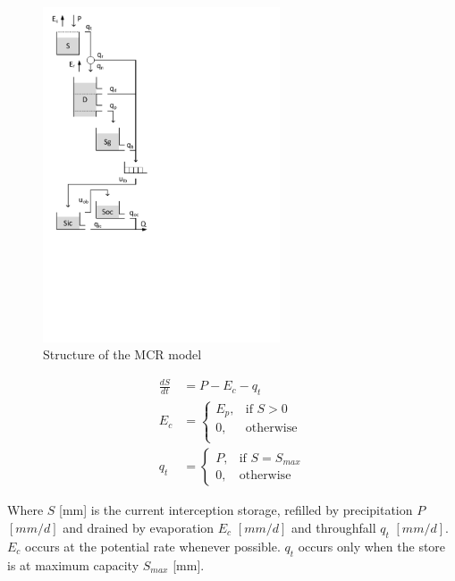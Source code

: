 { 																	%
\begin{figure}
\includegraphics[trim=1cm 10cm 7cm 1cm,width=7cm,keepaspectratio]{./files/39_schematic.pdf}
\caption{Structure of the MCR model} \label{fig:39_schematic}
\end{figure}

\begin{align}
	\frac{dS}{dt} &= P-E_c-q_t \\
	E_c &= \begin{cases}
		E_p, &\text{if } S > 0 \\
		0, & \text{otherwise} \\
	\end{cases} \\
	q_t &= 
	\begin{cases}
		P, & \text{if } S=S_{max} \\
		0, & \text{otherwise}
	\end{cases}
\end{align}

Where $S$ [mm] is the current interception storage, refilled by precipitation $P$ $[mm/d]$ and drained by evaporation $E_c$ $[mm/d]$ and throughfall $q_t$ $[mm/d]$.
$E_c$ occurs at the potential rate whenever possible.
$q_t$ occurs only when the store is at maximum capacity $S_{max}$ [mm].

}

